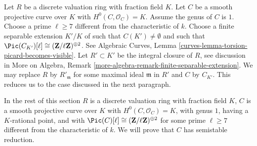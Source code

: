 \medskip\noindent
Let $R$ be a discrete valuation ring with fraction field $K$.
Let $C$ be a smooth projective curve over $K$ with $H^0(C, \mathcal{O}_C) = K$.
Assume the genus of $C$ is $1$.
Choose a prime $\ell \geq 7$ different from the characteristic of $k$.
Choose a finite separable extension $K'/K$ of
such that $C(K') \not = \emptyset$ and such that
$\Pic(C_{K'})[\ell] \cong (\mathbf{Z}/\ell \mathbf{Z})^{\oplus 2}$.
See
Algebraic Curves, Lemma \ref{curves-lemma-torsion-picard-becomes-visible}.
Let $R' \subset K'$ be the integral closure of $R$, see
discussion in More on Algebra, Remark
\ref{more-algebra-remark-finite-separable-extension}.
We may replace $R$ by $R'_{\mathfrak m}$ for some maximal ideal
$\mathfrak m$ in $R'$ and $C$ by $C_{K'}$. This
reduces us to the case discussed in the next paragraph.

\medskip\noindent
In the rest of this section
$R$ is a discrete valuation ring with fraction field $K$,
$C$ is a smooth projective curve over $K$ with $H^0(C, \mathcal{O}_C) = K$,
with genus $1$, having a $K$-rational point, and with
$\Pic(C)[\ell] \cong (\mathbf{Z}/\ell \mathbf{Z})^{\oplus 2}$
for some prime $\ell \geq 7$ different from the characteristic of $k$.
We will prove that $C$ has semistable reduction.

